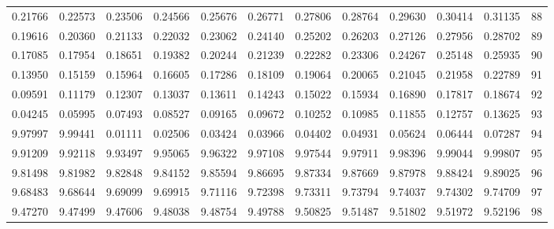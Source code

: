 \begin{center}
\begin{tabular}{|rrrrrrrrrrr|r|}
0.21766&0.22573&0.23506&0.24566&0.25676&0.26771&0.27806&0.28764&0.29630&0.30414&0.31135&88\\
0.19616&0.20360&0.21133&0.22032&0.23062&0.24140&0.25202&0.26203&0.27126&0.27956&0.28702&89\\[5pt]
0.17085&0.17954&0.18651&0.19382&0.20244&0.21239&0.22282&0.23306&0.24267&0.25148&0.25935&90\\
0.13950&0.15159&0.15964&0.16605&0.17286&0.18109&0.19064&0.20065&0.21045&0.21958&0.22789&91\\
0.09591&0.11179&0.12307&0.13037&0.13611&0.14243&0.15022&0.15934&0.16890&0.17817&0.18674&92\\
0.04245&0.05995&0.07493&0.08527&0.09165&0.09672&0.10252&0.10985&0.11855&0.12757&0.13625&93\\
9.97997&9.99441&0.01111&0.02506&0.03424&0.03966&0.04402&0.04931&0.05624&0.06444&0.07287&94\\[5pt]
9.91209&9.92118&9.93497&9.95065&9.96322&9.97108&9.97544&9.97911&9.98396&9.99044&9.99807&95\\
9.81498&9.81982&9.82848&9.84152&9.85594&9.86695&9.87334&9.87669&9.87978&9.88424&9.89025&96\\
9.68483&9.68644&9.69099&9.69915&9.71116&9.72398&9.73311&9.73794&9.74037&9.74302&9.74709&97\\
9.47270&9.47499&9.47606&9.48038&9.48754&9.49788&9.50825&9.51487&9.51802&9.51972&9.52196&98\\
\hline\end{tabular}
\end{center}
